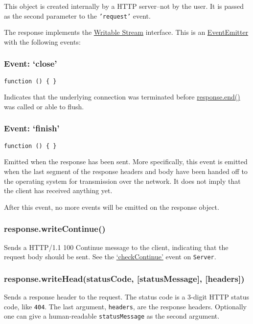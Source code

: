 This object is created internally by a HTTP server--not by the user. It
is passed as the second parameter to the \texttt{'request'} event.

The response implements the
\href{stream.html\#stream_class_stream_writable}{Writable Stream}
interface. This is an
\href{events.html\#events_class_events_eventemitter}{EventEmitter} with
the following events:

\subsubsection{Event: `close'}\label{event-close-1}

\texttt{function () \{ \}}

Indicates that the underlying connection was terminated before
\hyperref[httpux5fresponseux5fendux5fdataux5fencoding]{response.end()}
was called or able to flush.

\subsubsection{Event: `finish'}\label{event-finish}

\texttt{function () \{ \}}

Emitted when the response has been sent. More specifically, this event
is emitted when the last segment of the response headers and body have
been handed off to the operating system for transmission over the
network. It does not imply that the client has received anything yet.

After this event, no more events will be emitted on the response object.

\subsubsection{response.writeContinue()}\label{response.writecontinue}

Sends a HTTP/1.1 100 Continue message to the client, indicating that the
request body should be sent. See the
\hyperref[httpux5feventux5fcheckcontinue]{`checkContinue'} event on
\texttt{Server}.

\subsubsection{response.writeHead(statusCode, {[}statusMessage{]},
{[}headers{]})}\label{response.writeheadstatuscode-statusmessage-headers}

Sends a response header to the request. The status code is a 3-digit
HTTP status code, like \texttt{404}. The last argument,
\texttt{headers}, are the response headers. Optionally one can give a
human-readable \texttt{statusMessage} as the second argument.


